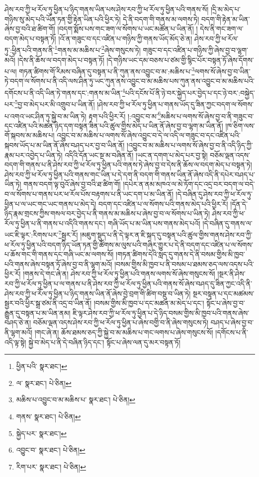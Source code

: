 ཤེས་རབ་ཀྱི་ཕ་རོལ་ཏུ་ཕྱིན་པ་ཉིད་གནས་ཡིན་པས་ཤེས་རབ་ཀྱི་ཕ་རོལ་ཏུ་ཕྱིན་པའི་གནས་སོ། །དྲི་མ་མེད་པ་གཉིས་སུ་མེད་པའི་ཡོན་ཏན་གྱི་རྟེན་ཡིན་པའི་ཕྱིར་ཏེ། དེ་ནི་བདག་གི་གནས་མ་ལགས་ཏེ། བདག་གི་རྟེན་མ་ཡིན་ཞེས་བྱ་བའི་ཐ་ཚིག་གོ། །བདག་སྨོས་པས་གང་ཟག་ལ་སོགས་པ་ཡང་མཚོན་པ་ཡིན་ནོ། །
དེས་ནི་གང་ཟག་ལ་བདག་མེད་པ་བསྟན་ཏོ། །འོ་ན་གཟུང་བ་དང་འཛིན་པ་གཉིས་ཀྱི་གནས་ཡོད་མོད་ཅེ་ན། ཤེས་རབ་ཀྱི་ཕ་རོལ་ཏུ་:ཕྱིན་པའི་གནས་ནི་\footnote{ཕྱིན་པའི་  སྣར་ཐང་། }གནས་མ་མཆིས་པ་\footnote{ལ་  སྣར་ཐང་།  པེ་ཅིན། }ཞེས་གསུངས་ཏེ། གཟུང་བ་དང་འཛིན་པ་གཉིས་ཀྱི་ཞེས་བྱ་བ་ལྷག་མའོ། །དེས་ནི་ཆོས་ལ་བདག་མེད་པ་བསྟན་ཏོ། །དེ་གཉིས་ཡང་དམ་བཅས་པ་ཙམ་གྱི་སྙིང་པོར་བསྟན་ཏོ་ཞེས་དོགས་པ་ལ། གཏན་ཚིགས་གོ་རིམས་བཞིན་དུ་བསྟན་པ་ནི་ཀུན་ནས་འབྱུང་བ་མ་:མཆིས་པ་\footnote{མཆིས་པ་འབྱུང་བ་མ་མཆིས་པ་  སྣར་ཐང་།  པེ་ཅིན། }ལགས་སོ་ཞེས་བྱ་བ་ཡིན་ཏེ་བདག་ལ་སོགས་པ་ནི་འདི་ལས་ཤིན་ཏུ་ཡང་ཀུན་ནས་འབྱུང་བ་མ་མཆིས་པས་ཀུན་ནས་འབྱུང་བ་མ་མཆིས་པའི་དགོངས་པ་ནི་འདི་ཡིན་ཏེ་གནས་དང་:གནས་མ་ཡིན་\footnote{གནས་  སྣར་ཐང་།  པེ་ཅིན། }པའི་དངོས་པོ་ནི་ཉེ་བར་སྐྱེད་པར་བྱེད་པ་དང་ཉེ་བར་:བསྐྱེད་པར་\footnote{སྐྱེད་པར་  སྣར་ཐང་། }བྱ་བ་མེད་པར་མི་འགྲུབ་པ་ཡིན་ནོ། །ཤེས་རབ་ཀྱི་ཕ་རོལ་ཏུ་ཕྱིན་པ་གནས་ཡོད་དུ་ཟིན་ཀྱང་བདག་ལ་སོགས་པ་འགའ་ཡང་ཤིན་ཏུ་སྐྱེ་བ་མ་ཡིན་ཏེ། རྟག་པའི་ཕྱིར་རོ། །:འབྱུང་བ་མ་\footnote{འབྱུང་བ་  སྣར་ཐང་།  པེ་ཅིན། }མཆིས་པ་ལགས་སོ་ཞེས་བྱ་བ་ནི་གཟུང་བ་དང་འཛིན་པའི་མཚན་ཉིད་དག་བསྟན་ཟིན་པའི་ཚུལ་གྱིས་མེད་པ་ཡིན་ནོ་ཞེས་བྱ་བ་ལྷག་མ་ཡིན་ནོ། །ཁ་ཅིག་ལས་གོ་སྐབས་མ་མཆིས་པ། འབྱུང་བ་མ་མཆིས་པ་ལགས་སོ་ཞེས་འབྱུང་བ་དེ་ལ་འདི་ལ་གཟུང་བ་དང་འཛིན་པའི་སྐབས་ཡོད་པ་མ་ཡིན་ནོ་ཞེས་བཤད་པར་བྱ་བ་ཡིན་ནོ། །འབྱུང་བ་མ་མཆིས་པ་ལགས་སོ་ཞེས་བྱ་བ་ནི་འདི་ཉིད་ཀྱི་རྣམ་པར་འབྱེད་པ་ཡིན་ཏེ། འདིའི་དོན་ཡང་སྔ་མ་བཞིན་ནོ། །ཡང་ན་དགག་པ་མེད་པར་བྱ་སྟེ། བཅོམ་ལྡན་འདས་བདག་གི་གནས་པ་ནི་ཤེས་རབ་ཀྱི་ཕ་རོལ་ཏུ་ཕྱིན་པའི་གནས་ཏེ་ཞེས་བྱ་བ་དེས་ནི་ཆོས་ལ་བདག་མེད་པ་བསྟན་ཏེ། ཤེས་རབ་ཀྱི་ཕ་རོལ་ཏུ་ཕྱིན་པའི་གནས་གང་ཡིན་པ་དེ་དག་ནི་བདག་གི་གནས་ཡིན་ནོ་ཞེས་འདི་ནི་དཔེར་བཤད་པ་ཡིན་ཏེ། གནས་བདག་ལྟ་བུའོ་ཞེས་བྱ་བའི་ཐ་ཚིག་གོ། །དཔེར་ན་ནམ་མཁའ་ལ་མེ་ཏོག་དང་འདྲ་བར་བདག་ལ་བདེ་བ་ལ་སོགས་པ་གནས་པར་ཕ་རོལ་པོས་བརྟགས་པ་ནི་ཡང་དག་པ་མ་ཡིན་ནོ། །དེ་བཞིན་དུ་ཤེས་རབ་ཀྱི་ཕ་རོལ་ཏུ་ཕྱིན་པ་ལ་ཡང་གང་ཡང་གནས་པ་མེད་དེ། བདག་དང་འཛིན་པ་ལ་སོགས་པའི་གནས་མེད་པའི་ཕྱིར་རོ། །དོན་དེ་ཉིད་རྣམ་གྲངས་ཀྱིས་གསལ་བར་བྱེད་པ་ནི་གནས་མ་མཆིས་པ་ཞེས་བྱ་བ་ལ་སོགས་པ་ཡིན་ཏེ། ཤེས་རབ་ཀྱི་ཕ་རོལ་ཏུ་ཕྱིན་པ་ནི་གནས་པ་འདིའི་གནས་དང་། གཞི་ཡོད་པ་མ་ཡིན་པས་གནས་མེད་པའོ། །དེ་བཞིན་དུ་གནས་ལ་ཡང་ཇི་ལྟར་:རིགས་པར་\footnote{རིག་པར་  སྣར་ཐང་།  པེ་ཅིན། }སྦྱར་རོ། །མཇུག་སྡུད་པ་ནི་དེ་ལྟར་ན་ཇི་སྐད་དུ་བསྟན་པའི་ཚུལ་གྱིས་གནས་ཤེས་རབ་ཀྱི་ཕ་རོལ་ཏུ་ཕྱིན་པའི་བདག་ཉིད་ཡོན་ཏན་གྱི་ཚོགས་མ་ལུས་པའི་གཞིར་གྱུར་པ་དེ་ནི་བདག་དང་འཛིན་པ་ལ་སོགས་པ་ཆོས་གང་གི་གནས་དང་གཞི་ཡང་མ་ལགས་སོ། །གཏན་ཚིགས་དེའི་སླད་དུ་གནས་དེ་ནི་བསམ་གྱིས་མི་ཁྱབ་པའི་གནས་ཞེས་བསྟན་ཏོ་ཞེས་བྱ་བ་ནི་ལྷག་མའོ། །བསམ་གྱིས་མི་ཁྱབ་པ་ནི་བསམ་པ་ཐམས་ཅད་ལས་འདས་པའི་ཕྱིར་རོ། །གནས་དེ་གང་ཞེ་ན། ཤེས་རབ་ཀྱི་ཕ་རོལ་ཏུ་ཕྱིན་པའི་གནས་ལགས་སོ་ཞེས་གསུངས་སོ། །སྔར་ནི་ཤེས་རབ་ཀྱི་ཕ་རོལ་ཏུ་ཕྱིན་པ་ལ་གནས་པ་ནི་ཤེས་རབ་ཀྱི་ཕ་རོལ་ཏུ་ཕྱིན་པའི་གནས་སོ་ཞེས་བཤད་དུ་ཟིན་ཀྱང་འདི་ནི་ཤེས་རབ་ཀྱི་ཕ་རོལ་ཏུ་ཕྱིན་པ་ཉིད་གནས་ཡིན་ནོ་ཞེས་བྱེ་བྲག་གི་ཚིག་བསྡུ་བ་ཡིན་ཏེ། སྔར་བསྟན་པ་དང་མཚམས་སྦྱར་བའི་ཕྱིར་སྒྲ་ཙམ་ནི་འདྲ་བ་ཡིན་ནོ། །བསམ་གྱིས་མི་ཁྱབ་པ་དང་མཚན་མ་མེད་པ་དང་། སྟོང་པ་ཞེས་བྱ་བ་རྒྱུན་དུ་བསྟན་པ་མ་ཡིན་ནམ། ཇི་ལྟར་ཤེས་རབ་ཀྱི་ཕ་རོལ་ཏུ་ཕྱིན་པ་དེ་ཉིད་བསམ་གྱིས་མི་ཁྱབ་པའི་གནས་ཞེས་བཤད་ཅེ་ན། བཅོམ་ལྡན་འདས་ཤེས་རབ་ཀྱི་ཕ་རོལ་ཏུ་ཕྱིན་པ་ཞེས་བགྱི་བ་ནི་ཞེས་གསུངས་ཏེ། བཤད་པ་ཞེས་བྱ་བ་ནི་ལྷག་མའོ། །གང་ཞེ་ན། ཆོས་ཐམས་ཅད་ཀྱི་སྐྱེ་བ་མ་མཆིས་པ་གང་ལགས་པ་ཞེས་གསུངས་སོ། །དགོངས་པ་ནི་འདི་ལྟ་སྟེ། སྐྱེ་བ་མེད་པ་ནི་དེ་བཞིན་ཉིད་དང་། སྟོང་པ་ཞེས་ལན་དུ་མར་བསྟན་ཏོ། 